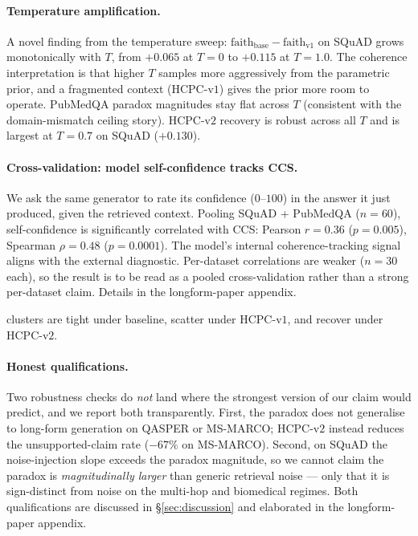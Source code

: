 \paragraph{Temperature amplification.}
A novel finding from the temperature sweep:
$\textrm{faith}_{\textrm{base}} - \textrm{faith}_{\textrm{v1}}$ on
SQuAD grows monotonically with $T$, from $+0.065$ at $T=0$ to
$+0.115$ at $T=1.0$. The coherence interpretation is that higher $T$
samples more aggressively from the parametric prior, and a fragmented
context (HCPC-v$1$) gives the prior more room to operate. PubMedQA
paradox magnitudes stay flat across $T$ (consistent with the
domain-mismatch ceiling story). HCPC-v$2$ recovery is robust across
all $T$ and is largest at $T=0.7$ on SQuAD ($+0.130$).

\paragraph{Cross-validation: model self-confidence tracks CCS.}
We ask the same generator to rate its confidence ($0$--$100$) in the
answer it just produced, given the retrieved context. Pooling SQuAD +
PubMedQA ($n=60$), self-confidence is significantly correlated with
CCS: Pearson $r=0.36$ ($p=0.005$), Spearman $\rho=0.48$ ($p=0.0001$).
The model's internal coherence-tracking signal aligns with the
external diagnostic. Per-dataset correlations are weaker ($n=30$
each), so the result is to be read as a pooled cross-validation rather
than a strong per-dataset claim. Details in
the longform-paper appendix.

clusters are tight under baseline, scatter under HCPC-v$1$, and
recover under HCPC-v$2$.

\paragraph{Honest qualifications.}
Two robustness checks do \emph{not} land where the strongest version of
our claim would predict, and we report both transparently. First, the
paradox does not generalise to long-form generation on QASPER or
MS-MARCO; HCPC-v$2$ instead reduces the unsupported-claim rate
($-67\%$ on MS-MARCO). Second, on SQuAD the noise-injection slope
exceeds the paradox magnitude, so we cannot claim the paradox is
\emph{magnitudinally larger} than generic retrieval noise --- only
that it is sign-distinct from noise on the multi-hop and biomedical
regimes. Both qualifications are discussed in
\S\ref{sec:discussion} and elaborated in
the longform-paper appendix.
